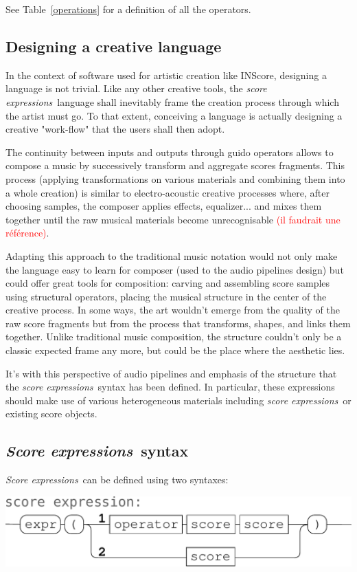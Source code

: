 \documentclass{article}
\newcommand{\note}[1]{\textcolor{red}{(#1)}}
\newcommand{\sExpr}{\emph{score expressions}}
\newcommand{\SExpr}{\emph{Score expressions}}
\begin{document}
See Table~\ref{operations} for a definition of all the operators.

\subsection{Designing a creative language}
In the context of software used for artistic creation like INScore, designing a language is not trivial. Like any other creative tools,  the \sExpr\ language shall inevitably frame the creation process through which the artist must go. To that extent, conceiving a language is actually designing a creative "work-flow" that the users shall then adopt.

The continuity between inputs and outputs through guido operators allows to compose a music by successively transform and aggregate scores fragments. This process (applying transformations on various materials and combining them into a whole creation) is similar to electro-acoustic creative processes where, after choosing samples, the composer applies effects, equalizer... and mixes them together until the raw musical materials become unrecognisable \note{il faudrait une référence}.

Adapting this approach to the traditional music notation would not only make the language easy to learn for composer (used to the audio pipelines design) but could offer great tools for composition: carving and assembling score samples using structural operators, placing the musical structure
 in the center of the creative process. In some ways, the art wouldn't emerge from the quality of the raw score fragments but from the process that transforms, shapes, and links them together. Unlike traditional music composition, the structure couldn't only be a classic expected frame any more, but could be the place where the aesthetic lies.

It's with this perspective of audio pipelines and emphasis of the structure that the \sExpr\ syntax has been defined. In particular, these expressions should make use of various heterogeneous materials including \sExpr\ or existing score objects.

\subsection{\SExpr\ syntax}
\smallbreak
\SExpr\ can be defined using two syntaxes:
\begin{center}
\includegraphics[width=0.9\columnwidth]{imgs/syntax1}
\end{center}
\end{document}
